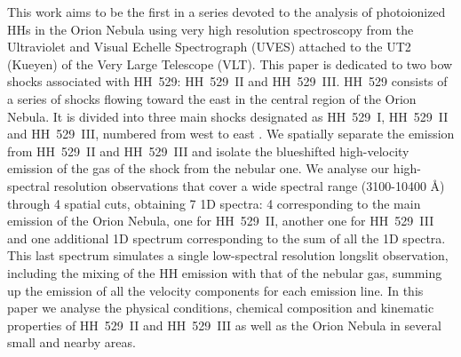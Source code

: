 \documentclass[fleqn,usenatbib]{mnras}
\begin{document}
This work aims to be the first in a series devoted to the analysis of photoionized HHs in the Orion Nebula using very high resolution spectroscopy from the Ultraviolet and Visual Echelle Spectrograph (UVES) \citep{Dodorico00} attached to the UT2 (Kueyen) of the Very Large Telescope (VLT). This paper is dedicated to two bow shocks associated with HH~529: HH~529~II and HH~529~III. HH~529 consists of a series of shocks flowing toward the east in the central region of the Orion Nebula. It is divided into three main shocks designated as HH~529~I, HH~529~II and HH~529~III, numbered from west to east \citep{odellyhenney08}. We spatially separate the emission from HH~529~II and HH~529~III and isolate the blueshifted high-velocity emission of the gas of the shock from the nebular one. We analyse our high-spectral resolution observations that cover a wide spectral range (3100-10400 \AA) through 4 spatial cuts, obtaining 7 1D spectra: 4 corresponding to the main emission of the Orion Nebula, one for HH~529~II, another one for HH~529~III and one additional 1D spectrum corresponding to the sum of all the 1D spectra. This last spectrum simulates a single low-spectral resolution longslit observation, including the mixing of the HH emission with that of the nebular gas, summing up the emission of all the velocity components for each emission line. In this paper we  analyse the physical conditions, chemical composition and kinematic properties of HH~529~II and HH~529~III as well as the Orion Nebula in several small and nearby areas. 
\end{document}
